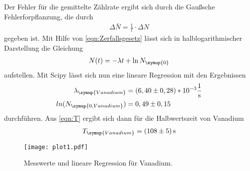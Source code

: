 Der Fehler für die gemittelte Zählrate ergibt sich durch die Gaußsche Fehlerforpflanzung, die durch
\begin{align*}
  \Delta\bar{N} = \frac{1}{t}\cdot\Delta N
\end{align*}
gegeben ist. Mit Hilfe von \autoref{eqn:Zerfallsgesetz} lässt sich in halblogarithmischer Darstellung die
Gleichung
\begin{align*}
  N(t) = -\lambda t + \ln{N_{\symup{0}}}
\end{align*}
aufstellen. Mit Scipy lässt sich nun eine lineare Regression mit den Ergebnissen
\begin{align*}
  \lambda_{\symup{Vanadium}} &= (6,40 \pm 0,28)*10^{-3} \frac{1}{\unit{\second}} \\
  ln(N_{\symup{0, Vanadium}}) &= 0,49 \pm 0,15 \\
\end{align*}
durchführen. Aus \autoref{eqn:T} ergibt sich dann für die Halbwertszeit von Vanadium
\begin{align*}
  T_{\symup{Vanadium}} = (108 \pm 5)\,\unit{\second}
\end{align*}

\begin{figure}
  \centering
  \texttt{[image: plot1.pdf]}
  \caption{Messwerte und lineare Regression für Vanadium.}
  \label{fig:vanadium}
\end{figure}

